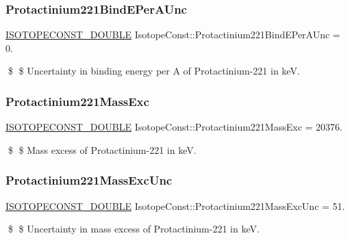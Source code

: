 \subsubsection{\texorpdfstring{Protactinium221\+Bind\+E\+Per\+A\+Unc}{Protactinium221BindEPerAUnc}}
{\footnotesize\ttfamily \mbox{\hyperlink{group___isotope_const-_macros_ga8f45a7272ce02c0b4c65c44636ed719a}{I\+S\+O\+T\+O\+P\+E\+C\+O\+N\+S\+T\+\_\+\+D\+O\+U\+B\+LE}} Isotope\+Const\+::\+Protactinium221\+Bind\+E\+Per\+A\+Unc = 0.}

\$ \$ Uncertainty in binding energy per A of Protactinium-\/221 in keV. \mbox{\label{group___isotope_const-_protactinium-_pa221_ga8fd989d6bf4ee632f4800732593cb581}} 
\subsubsection{\texorpdfstring{Protactinium221\+Mass\+Exc}{Protactinium221MassExc}}
{\footnotesize\ttfamily \mbox{\hyperlink{group___isotope_const-_macros_ga8f45a7272ce02c0b4c65c44636ed719a}{I\+S\+O\+T\+O\+P\+E\+C\+O\+N\+S\+T\+\_\+\+D\+O\+U\+B\+LE}} Isotope\+Const\+::\+Protactinium221\+Mass\+Exc = 20376.}

\$ \$ Mass excess of Protactinium-\/221 in keV. \mbox{\label{group___isotope_const-_protactinium-_pa221_ga81be06ac8afa017b2fcdc3d70db25004}} 
\subsubsection{\texorpdfstring{Protactinium221\+Mass\+Exc\+Unc}{Protactinium221MassExcUnc}}
{\footnotesize\ttfamily \mbox{\hyperlink{group___isotope_const-_macros_ga8f45a7272ce02c0b4c65c44636ed719a}{I\+S\+O\+T\+O\+P\+E\+C\+O\+N\+S\+T\+\_\+\+D\+O\+U\+B\+LE}} Isotope\+Const\+::\+Protactinium221\+Mass\+Exc\+Unc = 51.}

\$ \$ Uncertainty in mass excess of Protactinium-\/221 in keV. \mbox{\label{group___isotope_const-_protactinium-_pa221_ga6b292499c95e302638b4954e08ee1c98}} 
